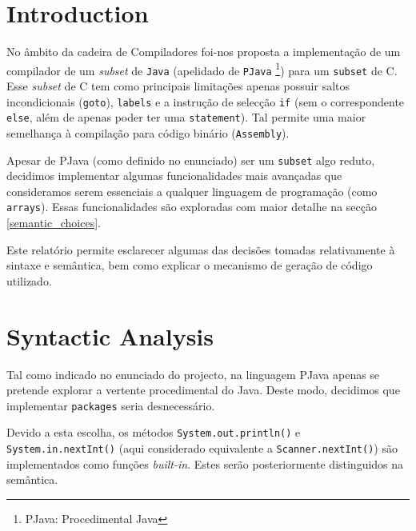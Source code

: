 \documentclass[a4paper]{article}
\title{\documentTitle}
\author{\documentAuthors{}}
\begin{document}
\renewcommand{\figurename}{Figure}
\renewcommand{\contentsname}{Contents}

\maketitle
\cleardoublepage

\tableofcontents
\cleardoublepage

\setlength{\parindent}{1cm}
\setlength{\parskip}{0.3cm}

\section{Introduction}
\indent \indent No âmbito da cadeira de Compiladores foi-nos proposta a implementação de um compilador de um \textit{subset} de \texttt{Java} (apelidado de
\texttt{PJava} \footnote[1]{PJava: Procedimental Java}) para um \texttt{subset} de C. Esse \textit{subset} de C tem como principais limitações
apenas possuir saltos incondicionais (\texttt{goto}), \texttt{labels} e a instrução de selecção \texttt{if} (sem o correspondente \texttt{else}, além de apenas poder
ter uma \texttt{statement}). Tal permite uma maior semelhança à compilação para código binário (\texttt{Assembly}).

\indent Apesar de PJava (como definido no enunciado) ser um \texttt{subset} algo reduto, decidimos implementar algumas funcionalidades mais avançadas que consideramos
serem essenciais a qualquer linguagem de programação (como \texttt{arrays}). Essas funcionalidades são exploradas com maior detalhe na secção \ref{semantic_choices}.

\indent Este relatório permite esclarecer algumas das decisões tomadas relativamente à sintaxe e semântica, bem como explicar o mecanismo de geração de código
utilizado.

\cleardoublepage

\section{Syntactic Analysis} %
\label{syntactic_analysis}
\indent \indent Tal como indicado no enunciado do projecto, na linguagem PJava apenas se pretende explorar a vertente procedimental do Java. 
Deste modo, decidimos que implementar \texttt{packages} seria desnecessário.

\indent Devido a esta escolha, os métodos \texttt{System.out.println()} e \texttt{System.in.nextInt()} (aqui considerado equivalente a \texttt{Scanner.nextInt()})
são implementados como funções \emph{built-in}. Estes serão posteriormente distinguidos na semântica.
\end{document}
